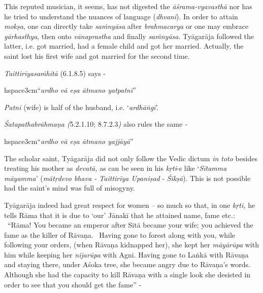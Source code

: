 This reputed musician, it seems, has not digested the \textit{āśrama-vyavasthā} nor has he tried to understand the nuances of language (\textit{dhvani}). In order to attain \textit{mokṣa}, one can directly take \textit{saṁnyāsa} after \textit{brahmacarya} or one may embrace \textit{gārhasthya}, then onto \textit{vānaprastha} and finally \textit{saṁnyāsa}. Tyāgarāja followed the latter, i.e. got married, had a female child and got her married. Actually, the saint lost his first wife and got married for the second time.

\textit{Taittirīyasaṁhitā} (6.1.8.5) says -

\begin{myquote}
hspace{3cm}“\textit{ardho vā eṣa ātmano yatpatnī}”
\end{myquote}

\textit{Patnī} (wife) is half of the husband, i.e. ‘\textit{ardhāṅgī}’.

\textit{Śatapathabrāhmaṇa (}5.2.1.10; 8.7.2.3\textit{)} also rules the same \textit{-}

\begin{myquote}
hspace{3cm}“\textit{ardho vā eṣa ātmano yajjāyā}”
\end{myquote}

The scholar saint, Tyāgarāja did not only follow the Vedic dictum \textit{in toto} besides treating his mother as \textit{devatā,} as can be seen in his \textit{kṛti}-s like ‘\textit{Sītamma māyamma}’ (\textit{mātṛdevo bhava - Taittirīya Upaniṣad} - \textit{Śikṣā}). This is not possible had the saint’s mind was full of misogyny.

Tyāgarāja indeed had great respect for women – so much so that, in one \textit{kṛti,} he tells Rāma that it is due to ‘our’ Jānakī that he attained name, fame etc.:  “Rāma! You became an emperor after Sītā became your wife; you achieved the fame as the killer of Rāvaṇa.  Having gone to forest along with you, while following your orders, (when Rāvaṇa kidnapped her), she kept her \textit{māyārūpa} with him while keeping her \textit{nijarūpa} with Agni. Having gone to Laṅkā with Rāvaṇa and staying there, under Aśoka tree, she became angry due to Rāvaṇa’s words. Although she had the capacity to kill Rāvaṇa with a single look she desisted in order to see that you should get the fame” -  

